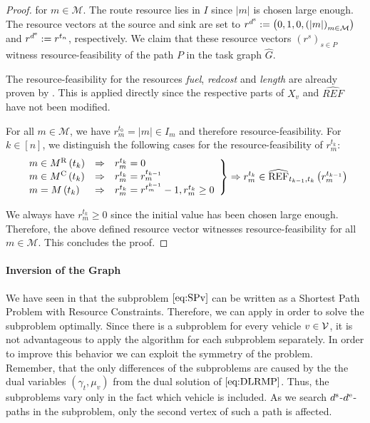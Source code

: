 \begin{proof}
for $m\in\mathcal{M}$. The route resource lies in $I$ since $\vert m\vert$ is chosen large enough. The resource vectors at the source and sink are set to ${r^{d^{\operatorname{s}}} := \left(0,1,0,\left(\vert m\vert\right)_{m\in\mathcal{M}}\right)}$ and ${r^{d^{\operatorname{e}}} := r^{t_n}}$, respectively. We claim that these resource vectors $\left(r^s\right)_{s\in P}$ witness resource-feasibility of the path $P$ in the task graph $\widehat{G}$. 

The resource-feasibility for the resources \emph{fuel}, \emph{redcost} and \emph{length} are already proven by \cite{Kaiser}. This is applied directly since the respective parts of $X_v$ and $\widehat{REF}$ have not been modified.

For all $m\in\mathcal{M}$, we have ${r^{t_0}_m = \vert m\vert\in I_m}$ and therefore resource-feasibility. For ${k\in[n]}$, we distinguish the following cases for the resource-feasibility of $r^{t_k}_m$:
\begin{align*}
	\left. \begin{array}{lll}
		m\in M^{\operatorname{R}}\left(t_k\right) & \Rightarrow & r^{t_k}_m = 0 \\
		m\in M^{\operatorname{C}}\left(t_k\right) & \Rightarrow & r^{t_k}_m = r^{t_{k-1}}_m \\
		m = M\left(t_k\right) & \Rightarrow & r^{t_k}_m = r^{t^{k-1}_m} - 1, r^{t_k}_m\geq 0
	\end{array} \right\} \Rightarrow r^{t_k}_m\in\widehat{\operatorname{REF}}_{t_{k-1},t_k}\left(r^{t_{k-1}}_m\right)
\end{align*}

We always have ${r^{t_k}_m\geq 0}$ since the initial value has been chosen large enough. Therefore, the above defined resource vector witnesses resource-feasibility for all $m\in\mathcal{M}$. This concludes the proof.

\end{proof}

\paragraph{Inversion of the Graph} \parfill

We have seen in  that the subproblem $\eqref{eq:SPv}$ can be written as a Shortest Path Problem with Resource Constraints. Therefore, we can apply  in order to solve the subproblem optimally. Since there is a subproblem for every vehicle $v\in\mathcal{V}$, it is not advantageous to apply the algorithm for each subproblem separately. In order to improve this behavior we can exploit the symmetry of the problem. Remember, that the only differences of the subproblems are caused by the the dual variables $\left(\gamma_t,\mu_v\right)$ from the dual solution of $\eqref{eq:DLRMP}$. Thus, the subproblems vary only in the fact which vehicle is included. As we search $d^{\operatorname{s}}$-$d^{\operatorname{e}}$-paths in the subproblem, only the second vertex of such a path is affected. 

